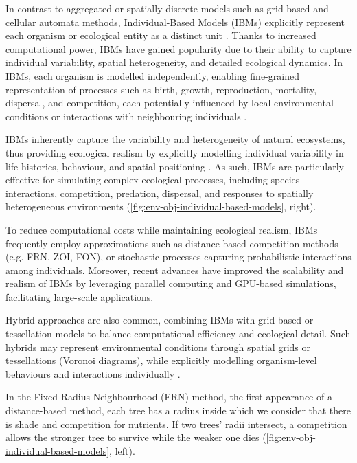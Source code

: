 In contrast to aggregated or spatially discrete models such as grid-based and cellular automata methods, Individual-Based Models (IBMs) explicitly represent each organism or ecological entity as a distinct unit \cite{Crooks2017}. Thanks to increased computational power, IBMs have gained popularity due to their ability to capture individual variability, spatial heterogeneity, and detailed ecological dynamics. In IBMs, each organism is modelled independently, enabling fine-grained representation of processes such as birth, growth, reproduction, mortality, dispersal, and competition, each potentially influenced by local environmental conditions or interactions with neighbouring individuals \cite{Chng2013,Peytavie2024a}.

IBMs inherently capture the variability and heterogeneity of natural ecosystems, thus providing ecological realism by explicitly modelling individual variability in life histories, behaviour, and spatial positioning \cite{McLane2011,Zhang2020}. As such, IBMs are particularly effective for simulating complex ecological processes, including species interactions, competition, predation, dispersal, and responses to spatially heterogeneous environments (\cref{fig:env-obj-individual-based-models}, right).

To reduce computational costs while maintaining ecological realism, IBMs frequently employ approximations such as distance-based competition methods (e.g. FRN, ZOI, FON), or stochastic processes capturing probabilistic interactions among individuals. Moreover, recent advances have improved the scalability and realism of IBMs by leveraging parallel computing and GPU-based simulations, facilitating large-scale applications.

Hybrid approaches are also common, combining IBMs with grid-based or tessellation models to balance computational efficiency and ecological detail. Such hybrids may represent environmental conditions through spatial grids or tessellations (Voronoi diagrams), while explicitly modelling organism-level behaviours and interactions individually \cite{Chng2011a}.


In the Fixed-Radius Neighbourhood (FRN) method, the first appearance of a distance-based method, each tree has a radius inside which we consider that there is shade and competition for nutrients. If two trees' radii intersect, a competition allows the stronger tree to survive while the weaker one dies (\cref{fig:env-obj-individual-based-models}, left).

